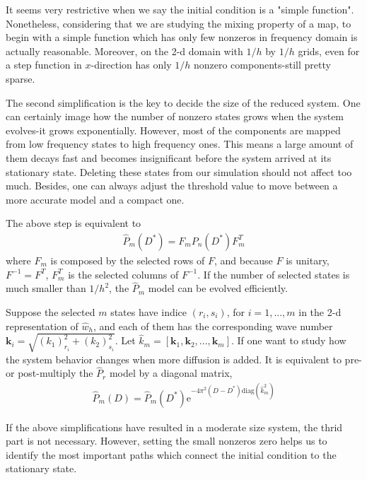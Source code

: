 It seems very restrictive when we say the initial condition is a
"simple function". Nonetheless, considering that we are studying the
mixing property of a map, to begin with a simple function which has
only few nonzeros in frequency domain is actually reasonable.
Moreover, on the 2-d domain with $1/h$ by $1/h$ grids, even for a step
function in $x$-direction has only $1/h$ nonzero components-still
pretty sparse.

The second simplification is the key to decide the size of the
reduced system. One can certainly image how the number of nonzero
states grows when the system evolves-it grows exponentially.
However, most of the components are mapped from low frequency states
to high frequency ones. This means a large amount of them decays
fast and becomes insignificant before the system arrived at its
stationary state. Deleting these states from our simulation should
not affect too much. Besides, one can always adjust the threshold
value to move between a more accurate model and a compact one.

The above step is equivalent to
\begin{eqnarray}
\label{Prmodel}
    \hat{P}_m(D^*) = F_m P_n(D^*) F_m^T
\end{eqnarray}
where $F_m$ is composed by the selected rows of $F$, and because $F$ is unitary, $F^{-1} = F^T$,
$F_m^T$ is the selected columns of $F^{-1}$. If the number of selected states is much smaller than
$1/h^2$, the $\hat{P}_m$ model can be evolved efficiently.

Suppose the selected $m$ states have indice $(r_i,s_i)$, for $i=1,...,m$
in the 2-d representation of $\hat{w}_h$, and each of them has the
corresponding wave number $\mathbf{k}_i = \sqrt{(k_1)_{r_i}^2+(k_2)_{s_i}^2}$.
Let $\hat{k}_m = [\mathbf{k}_1, \mathbf{k}_2,...,\mathbf{k}_m ]$.
If one want to study how the system behavior changes when more diffusion is added.
It is equivalent to pre- or post-multiply the $\hat{P}_r$ model by a diagonal matrix,
\begin{eqnarray}
\label{PraddDiffusion}
    \hat{P}_m(D) = \hat{P}_m(D^*)\text{e}^{-4 \pi^2 (D-D^*) \text{diag}(\hat{k}_m^2)}
\end{eqnarray}

If the above simplifications have resulted in a moderate size system,
the thrid part is not necessary. However, setting the small nonzeros
zero helps us to identify the most important paths which connect the
initial condition to the stationary state.



